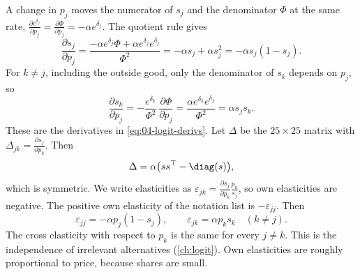 A change in $p_j$ moves the numerator of $s_j$ and the denominator $\Phi$ at the same rate,
$\frac{\partial e^{\delta_j}}{\partial p_j} = \frac{\partial\Phi}{\partial p_j} = -\alpha e^{\delta_j}$. The quotient rule gives
\begin{equation*}
  \frac{\partial s_j}{\partial p_j}
  = \frac{-\alpha e^{\delta_j}\Phi + \alpha e^{\delta_j}e^{\delta_j}}{\Phi^2}
  = -\alpha s_j + \alpha s_j^2
  = -\alpha s_j(1 - s_j) .
\end{equation*}
For $k \ne j$, including the outside good, only the denominator of $s_k$ depends on $p_j$, so
\begin{equation*}
  \frac{\partial s_k}{\partial p_j} = -\frac{e^{\delta_k}}{\Phi^2}\,\frac{\partial\Phi}{\partial p_j}
  = \frac{\alpha e^{\delta_k}e^{\delta_j}}{\Phi^2} = \alpha s_js_k .
\end{equation*}
These are the derivatives in \eqref{eq:04-logit-derivs}. Let $\Delta$ be the $25 \times 25$ matrix with
$\Delta_{jk} = \frac{\partial s_j}{\partial p_k}$. Then
\begin{equation}\label{eq:C-logit-Delta}
  \Delta = \alpha\big(ss^\top - \diag(s)\big) ,
\end{equation}
which is symmetric. We write elasticities as $\varepsilon_{jk} = \frac{\partial s_j}{\partial p_k}\frac{p_k}{s_j}$,
so own elasticities are negative. The positive own elasticity of the notation list is $-\varepsilon_{jj}$. Then
\begin{equation}\label{eq:C-logit-elast}
  \varepsilon_{jj} = -\alpha p_j(1 - s_j) , \qquad \varepsilon_{jk} = \alpha p_ks_k \quad (k \ne j) .
\end{equation}
The cross elasticity with respect to $p_k$ is the same for every $j \ne k$. This is the independence of irrelevant
alternatives (\cref{ch:logit}). Own elasticities are roughly proportional to price, because shares are small.

